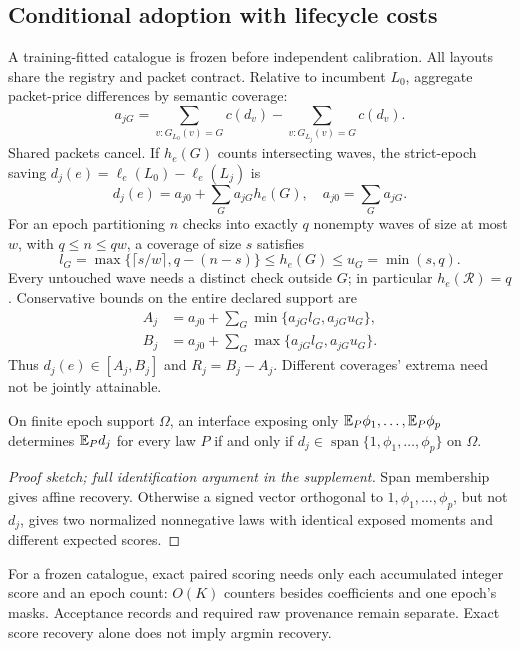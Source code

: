 \subsection{Conditional adoption with lifecycle costs}\label{sec:adoption}
A training-fitted catalogue is frozen before independent calibration.
All layouts share the registry and packet contract. Relative to incumbent
$L_0$, aggregate packet-price differences by semantic coverage:
\[
a_{jG}=\sum_{v:G_{L_0}(v)=G}c(d_v)
       -\sum_{v:G_{L_j}(v)=G}c(d_v).
\]
Shared packets cancel. If $h_e(G)$ counts intersecting waves, the
strict-epoch saving $d_j(e)=\ell_e(L_0)-\ell_e(L_j)$ is
\begin{equation}\label{eq:paired-saving}
d_j(e)=a_{j0}+\sum_Ga_{jG}h_e(G),\quad a_{j0}=\sum_Ga_{jG}.
\end{equation}
For an epoch partitioning $n$ checks into exactly $q$ nonempty waves
of size at most $w$, with $q\le n\le qw$, a coverage of size $s$ satisfies
\begin{equation}\label{eq:hit-envelope}
l_G=\max\{\lceil s/w\rceil,q-(n-s)\}
 \le h_e(G)\le u_G=\min(s,q).
\end{equation}
Every untouched wave needs a distinct check outside $G$; in particular
$h_e(\mathcal R)=q$. Conservative bounds on the entire declared support are
\begin{align*}
A_j&=a_{j0}+\sum_G\min\{a_{jG}l_G,a_{jG}u_G\},\\
B_j&=a_{j0}+\sum_G\max\{a_{jG}l_G,a_{jG}u_G\}.
\end{align*}
Thus $d_j(e)\in[A_j,B_j]$ and $R_j=B_j-A_j$.
Different coverages' extrema need not be jointly attainable.

\begin{proposition}\label{prop:summary-span}
On finite epoch support $\Omega$, an interface exposing only
$\mathbb E_P\phi_1,\ldots,\mathbb E_P\phi_p$ determines $\mathbb E_Pd_j$ for every law $P$
if and only if $d_j\in\operatorname{span}\{1,\phi_1,\ldots,\phi_p\}$
on $\Omega$.
\end{proposition}
\begin{proof}[Proof sketch; full identification argument in the supplement]
Span membership gives affine recovery. Otherwise a signed vector
orthogonal to $1,\phi_1,\ldots,\phi_p$, but not $d_j$, gives two
normalized nonnegative laws with identical exposed moments and different
expected scores.
\end{proof}
For a frozen catalogue, exact paired scoring needs only each accumulated
integer score and an epoch count: $O(K)$ counters besides coefficients
and one epoch's masks. Acceptance records and required raw provenance
remain separate. Exact score recovery alone does not imply argmin recovery.

